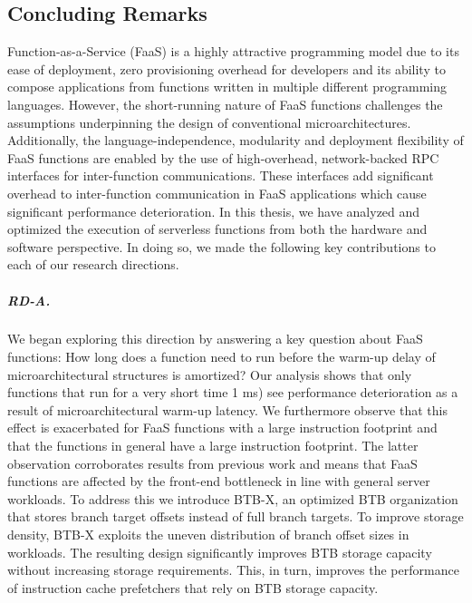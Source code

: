 \documentclass[../main.tex]{subfiles}
\begin{document}
\ifx\chapincluded\undefined
  \begin{refsection}
 \fi

\chapter{Concluding Remarks}
\label{chap:conclusions}
Function-as-a-Service (FaaS) is a highly attractive programming model
due to its ease of deployment, zero provisioning overhead for
developers and its ability to compose applications from functions
written in multiple different programming languages. However, the
short-running nature of FaaS functions challenges the assumptions
underpinning the design of conventional
microarchitectures. Additionally, the language-independence,
modularity and deployment flexibility of FaaS functions are enabled by
the use of high-overhead, network-backed RPC interfaces for
inter-function communications. These interfaces add significant
overhead to inter-function communication in FaaS applications which
cause significant performance deterioration. In this thesis, we have
analyzed and optimized the execution of serverless functions from both
the hardware and software perspective. In doing so, we made the
following key contributions to each of our research directions.


\paragraph{RD-A.} We began exploring this direction by answering a key
  question about FaaS functions: How long does a function need to run
  before the warm-up delay of microarchitectural structures is
  amortized? Our analysis shows that only functions that run for a very
  short time 1 ms) see performance deterioration as a result of
  microarchitectural warm-up latency. We furthermore observe that this
  effect is exacerbated for FaaS functions with a large instruction
  footprint and that the functions in general have a large instruction
  footprint. The latter observation corroborates results from previous
  work and means that FaaS functions are affected by the front-end
  bottleneck in line with general server workloads. To address this we
  introduce BTB-X, an optimized BTB organization that stores branch
  target offsets instead of full branch targets. To improve storage
  density, BTB-X exploits the uneven distribution of branch offset
  sizes in workloads. The resulting design significantly improves BTB
  storage capacity without increasing storage requirements. This, in
  turn, improves the performance of instruction cache prefetchers that
  rely on BTB storage capacity.


\end{refsection}
\end{document}
